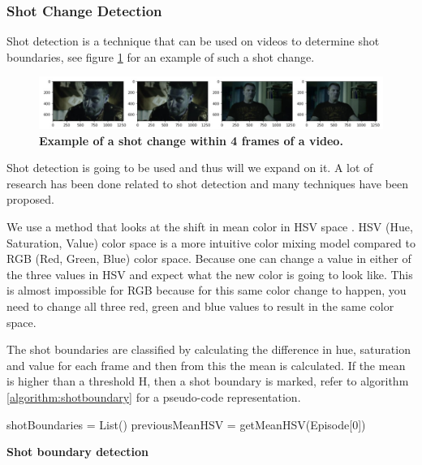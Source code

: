 \documentclass{article}
\begin{document}
\subsubsection{Shot Change Detection}

Shot detection is a technique that can be used on videos to determine shot boundaries, see figure \ref{shotchange} for an example of such a shot change. 

\begin{figure}[H]
	\includegraphics[width=12cm]{images/shotchange.jpg}
	\centering
	\caption{\textbf{Example of a shot change within 4 frames of a video.}}
	\label{shotchange}
\end{figure}

Shot detection is going to be used and thus will we expand on it. A lot of research has been done related to shot detection \cite{lienhart1998comparison} and many techniques have been proposed. 

We use a method that looks at the shift in mean color in HSV space \cite{shao2015shot}. HSV (Hue, Saturation, Value) color space is a more intuitive color mixing model compared to RGB (Red, Green, Blue) color space. Because one can change a value in either of the three values in HSV and expect what the new color is going to look like. This is almost impossible for RGB because for this same color change to happen, you need to change all three red, green and blue values to result in the same color space.

The shot boundaries are classified by calculating the difference in hue, saturation and value for each frame and then from this the mean is calculated. If the mean is higher than a threshold H, then a shot boundary is marked, refer to algorithm \ref{algorithm:shotboundary} for a pseudo-code representation.

\begin{algorithm}[H] 
	\SetAlgoLined
	shotBoundaries = List()\;
	previousMeanHSV = getMeanHSV(Episode[0])\;
	\caption{\textbf{Shot boundary detection}}
	\label{algorithm:shotboundary}
\end{algorithm}
\end{document}
